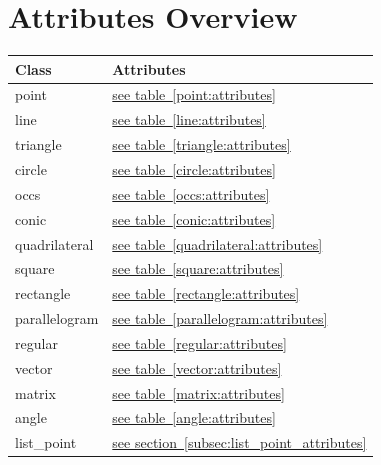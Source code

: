 \documentclass[
  DIV=16,
  fontsize=10,
  index=totoc,
  twoside,
  cadre,
  headings=small
]{tkz-doc}
\newcommand*\tkzTableRef[1]{\hyperref[#1]{see table~\ref*{#1}}}
\newcommand*\tkzSecRef[1]{\hyperref[#1]{see section~\ref*{#1}}}
\begin{document}
\clearpage
\listofoverviews

\clearpage
\section*{Attributes Overview}
\begin{tabular}{ll}
\textbf{Class} & \textbf{Attributes} \\
\hline
point         & \tkzTableRef{point:attributes}        \\
line          & \tkzTableRef{line:attributes}         \\
triangle      & \tkzTableRef{triangle:attributes}     \\
circle        & \tkzTableRef{circle:attributes}       \\
occs          & \tkzTableRef{occs:attributes}         \\
conic         & \tkzTableRef{conic:attributes}        \\
quadrilateral & \tkzTableRef{quadrilateral:attributes}\\
square        & \tkzTableRef{square:attributes}       \\
rectangle     & \tkzTableRef{rectangle:attributes}    \\
parallelogram & \tkzTableRef{parallelogram:attributes}\\
regular       & \tkzTableRef{regular:attributes}      \\
vector        & \tkzTableRef{vector:attributes}       \\
matrix        & \tkzTableRef{matrix:attributes}       \\
angle         & \tkzTableRef{angle:attributes}        \\
list\_point   & \tkzSecRef{subsec:list_point_attributes}   \\
\end{tabular}
\end{document}

